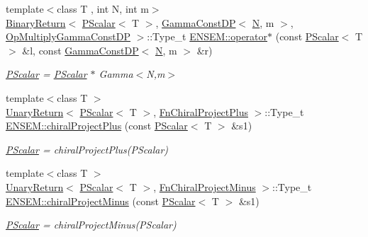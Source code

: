 \begin{DoxyCompactItemize}
{\footnotesize template$<$class T , int N, int m$>$ }\\\mbox{\hyperlink{structENSEM_1_1BinaryReturn}{Binary\+Return}}$<$ \mbox{\hyperlink{classENSEM_1_1PScalar}{P\+Scalar}}$<$ T $>$, \mbox{\hyperlink{classENSEM_1_1GammaConstDP}{Gamma\+Const\+DP}}$<$ \mbox{\hyperlink{adat__devel_2lib_2hadron_2operator__name__util_8cc_a7722c8ecbb62d99aee7ce68b1752f337}{N}}, m $>$, \mbox{\hyperlink{structENSEM_1_1OpMultiplyGammaConstDP}{Op\+Multiply\+Gamma\+Const\+DP}} $>$\+::Type\+\_\+t \mbox{\hyperlink{group__primscalar_ga97e70139990daa175326a04636431dbd}{E\+N\+S\+E\+M\+::operator$\ast$}} (const \mbox{\hyperlink{classENSEM_1_1PScalar}{P\+Scalar}}$<$ T $>$ \&l, const \mbox{\hyperlink{classENSEM_1_1GammaConstDP}{Gamma\+Const\+DP}}$<$ \mbox{\hyperlink{adat__devel_2lib_2hadron_2operator__name__util_8cc_a7722c8ecbb62d99aee7ce68b1752f337}{N}}, m $>$ \&r)
\begin{DoxyCompactList}\small\item\em \mbox{\hyperlink{classENSEM_1_1PScalar}{P\+Scalar}} = \mbox{\hyperlink{classENSEM_1_1PScalar}{P\+Scalar}} $\ast$ Gamma$<$\+N,m$>$ \end{DoxyCompactList}\item 
{\footnotesize template$<$class T $>$ }\\\mbox{\hyperlink{structENSEM_1_1UnaryReturn}{Unary\+Return}}$<$ \mbox{\hyperlink{classENSEM_1_1PScalar}{P\+Scalar}}$<$ T $>$, \mbox{\hyperlink{structENSEM_1_1FnChiralProjectPlus}{Fn\+Chiral\+Project\+Plus}} $>$\+::Type\+\_\+t \mbox{\hyperlink{group__primscalar_ga5c2866755d31c5ec528c5763aa16a833}{E\+N\+S\+E\+M\+::chiral\+Project\+Plus}} (const \mbox{\hyperlink{classENSEM_1_1PScalar}{P\+Scalar}}$<$ T $>$ \&s1)
\begin{DoxyCompactList}\small\item\em \mbox{\hyperlink{classENSEM_1_1PScalar}{P\+Scalar}} = chiral\+Project\+Plus(\+P\+Scalar) \end{DoxyCompactList}\item 
{\footnotesize template$<$class T $>$ }\\\mbox{\hyperlink{structENSEM_1_1UnaryReturn}{Unary\+Return}}$<$ \mbox{\hyperlink{classENSEM_1_1PScalar}{P\+Scalar}}$<$ T $>$, \mbox{\hyperlink{structENSEM_1_1FnChiralProjectMinus}{Fn\+Chiral\+Project\+Minus}} $>$\+::Type\+\_\+t \mbox{\hyperlink{group__primscalar_ga145e49e169b22a3ded82ba8af1b15da2}{E\+N\+S\+E\+M\+::chiral\+Project\+Minus}} (const \mbox{\hyperlink{classENSEM_1_1PScalar}{P\+Scalar}}$<$ T $>$ \&s1)
\begin{DoxyCompactList}\small\item\em \mbox{\hyperlink{classENSEM_1_1PScalar}{P\+Scalar}} = chiral\+Project\+Minus(\+P\+Scalar) \end{DoxyCompactList}\item 

\end{DoxyCompactItemize}
